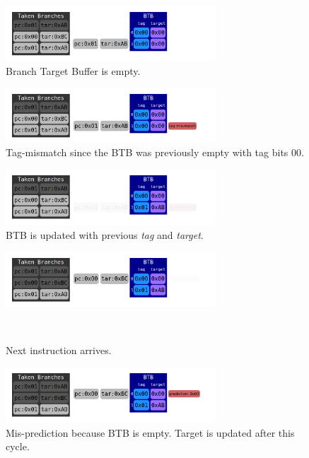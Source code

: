 \documentclass[12pt]{article}
\newenvironment{QandA}{\begin{enumerate}[label=\bfseries\alph*.]\bfseries}
                      {\end{enumerate}}
\newenvironment{answered}{\par\quad\normalfont}{}
\begin{document}
\begin{QandA}
\begin{answered}
\begin{figure}[!ht]
\centering
\includegraphics[width=0.7\textwidth]{chapter7_imgs/btb/btb000.png}
\caption{Branch Target Buffer is empty.}
\label{btb001}
\end{figure}

\begin{figure}[!ht]
\centering
\includegraphics[width=0.7\textwidth]{chapter7_imgs/btb/btb001.png}
\caption{Tag-mismatch since the BTB was previously empty with tag bits $00$.}
\label{btb002}
\end{figure}

\begin{figure}[!ht]
\centering
\includegraphics[width=0.7\textwidth]{chapter7_imgs/btb/btb002.png}
\caption{BTB is updated with previous \textit{tag} and \textit{target}.}
\label{btb003}
\end{figure}

\begin{figure}[!ht]
\centering
\includegraphics[width=0.7\textwidth]{chapter7_imgs/btb/btb003.png}
\caption{Next instruction arrives.}\
\label{btb004}
\end{figure}

\begin{figure}[!ht]
\centering
\includegraphics[width=0.7\textwidth]{chapter7_imgs/btb/btb004.png}
\caption{Mis-prediction because BTB is empty. Target is updated after this cycle.}
\label{btb005}
\end{figure}


\end{answered}
\end{QandA}
\end{document}

